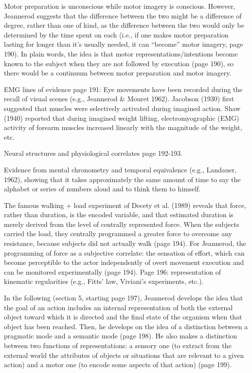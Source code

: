\documentclass[a4paper,12pt,twoside,openright,oldfontcommands]{memoir}
\begin{document}
Motor preparation is unconscious while motor imagery is conscious.
However, Jeannerod suggests that the difference between the two might be
a difference of degree, rather than one of kind, as the difference
between the two would only be determined by the time spent on each
(i.e., if one makes motor preparation lasting for longer than it's
usually needed, it can ``become'' motor imagery, page 190). In plain
words, the idea is that motor representations/intentions become known to
the subject when they are not followed by execution (page 190), so there
would be a continuum between motor preparation and motor imagery.

EMG lines of evidence page 191: Eye movements have been recorded during
the recall of visual scenes (e.g., Jeannerod \& Mouret 1962). Jacobson
(1930) first suggested that muscles were selectively activated during
imagined action. Shaw (1940) reported that during imagined weight
lifting, electromyographic (EMG) activity of forearm muscles increased
linearly with the magnitude of the weight, etc.

Neural structures and physiological correlates page 192-193.

Evidence from mental chronometry and temporal equivalence (e.g.,
Landauer, 1962), showing that it takes approximately the same amount of
time to say the alphabet or series of numbers aloud and to think them to
himself.

The famous walking + load experiment of Decety et al. (1989) reveals
that force, rather than duration, is the encoded variable, and that
estimated duration is merely derived from the level of centrally
represented force. When the subjects carried the load, they centrally
programmed a greater force to overcome any resistance, because subjects
did not actually walk (page 194). For Jeannerod, the programming of
force as a subjective correlate: the sensation of effort, which can
become perceptible to the actor independently of overt movement
execution and can be monitored experimentally (page 194). Page 196:
representation of kinematic regularities (e.g., Fitts' law, Viviani's
experiments, etc.).

In the following (section 5, starting page 197), Jeannerod develops the
idea that the goal of an action includes an internal representation of
both the external object toward which it is directed and the final state
of the organism when that object has been reached. Then, he develops on
the idea of a distinction between a pragmatic mode and a semantic mode
(page 198). He also makes a distinction between two functions of
representations: a sensory one (to extract from the external world the
attributes of objects or situations that are relevant to a given action)
and a motor one (to encode some aspects of that action) (page 199).
\end{document}
